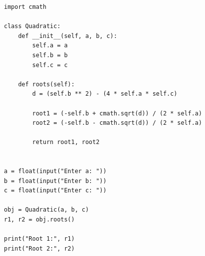 \begin{verbatim}
import cmath

class Quadratic:
    def __init__(self, a, b, c):
        self.a = a
        self.b = b
        self.c = c

    def roots(self):
        d = (self.b ** 2) - (4 * self.a * self.c)

        root1 = (-self.b + cmath.sqrt(d)) / (2 * self.a)
        root2 = (-self.b - cmath.sqrt(d)) / (2 * self.a)

        return root1, root2


a = float(input("Enter a: "))
b = float(input("Enter b: "))
c = float(input("Enter c: "))

obj = Quadratic(a, b, c)
r1, r2 = obj.roots()

print("Root 1:", r1)
print("Root 2:", r2)
\end{verbatim}